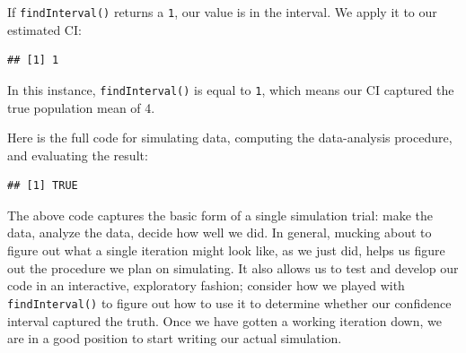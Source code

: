 \documentclass[
]{book}
\newenvironment{Shaded}{\begin{snugshade}}{\end{snugshade}}
\newcommand{\AttributeTok}[1]{\textcolor[rgb]{0.13,0.29,0.53}{#1}}
\newcommand{\CommentTok}[1]{\textcolor[rgb]{0.56,0.35,0.01}{\textit{#1}}}
\newcommand{\DecValTok}[1]{\textcolor[rgb]{0.00,0.00,0.81}{#1}}
\newcommand{\FunctionTok}[1]{\textcolor[rgb]{0.13,0.29,0.53}{\textbf{#1}}}
\newcommand{\NormalTok}[1]{#1}
\newcommand{\OtherTok}[1]{\textcolor[rgb]{0.56,0.35,0.01}{#1}}
\newcommand{\SpecialCharTok}[1]{\textcolor[rgb]{0.81,0.36,0.00}{\textbf{#1}}}
\begin{document}
If \texttt{findInterval()} returns a \texttt{1}, our value is in the interval.
We apply it to our estimated CI:

\begin{Shaded}
\end{Shaded}

\begin{verbatim}
## [1] 1
\end{verbatim}

In this instance, \texttt{findInterval()} is equal to \texttt{1}, which means our CI captured the true population mean of 4.

Here is the full code for simulating data, computing the data-analysis procedure, and evaluating the result:

\begin{Shaded}
\end{Shaded}

\begin{verbatim}
## [1] TRUE
\end{verbatim}

The above code captures the basic form of a single simulation trial: make the data, analyze the data, decide how well we did.
In general, mucking about to figure out what a single iteration might look like, as we just did, helps us figure out the procedure we plan on simulating.
It also allows us to test and develop our code in an interactive, exploratory fashion; consider how we played with \texttt{findInterval()} to figure out how to use it to determine whether our confidence interval captured the truth.
Once we have gotten a working iteration down, we are in a good position to start writing our actual simulation.
\end{document}
